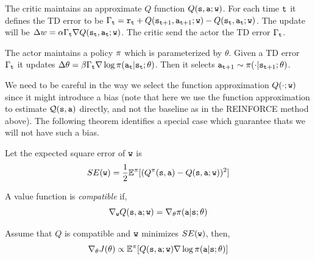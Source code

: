 The critic maintains an approximate $Q$ function $Q({\tt s},{\tt a};{\tt w})$. For each time ${\tt t}$ it defines the TD error to be $\Gamma_{\tt t} = {\tt r}_{\tt t} +Q({\tt s}_{{\tt t}+1},{\tt a}_{{\tt t}+1};{\tt w})-Q({\tt s}_{\tt t},{\tt a}_{\tt t};{\tt w})$. The update will be $\Delta w=\alpha\Gamma_{\tt t} \nabla Q({\tt s}_{\tt t},{\tt a}_{\tt t};{\tt w})$. The critic send the actor the TD error $\Gamma_{\tt t}$.

The actor maintains a policy $\pi$ which is parameterized by $\theta$. Given a TD error $\Gamma_{\tt t}$ it updates $\Delta \theta= \beta \Gamma_{\tt t} \nabla \log \pi({\tt a}_{\tt t}|{\tt s}_{\tt t};\theta)$. Then it selects ${\tt a}_{{\tt t}+1}\sim \pi(\cdot|{\tt s}_{{\tt t}+1};\theta)$.

We need to be careful in the way we select the function
approximation $Q(\cdot;{\tt w})$ since it might introduce a bias (note that here we use the function approximation to estimate $\mathcal{Q}({\tt s},{\tt a})$ directly, and not the baseline as in the REINFORCE method above).
The following theorem identifies a special case which guarantee
thats we will not have such a bias.

Let the expected square error of ${\tt w}$ is
\[
SE({\tt w})=\frac{1}{2}\mathbb{E}^\pi[(Q^\pi({\tt s},{\tt a})-Q({\tt s},{\tt a};{\tt w}))^2]
\]

A value function is {\em compatible} if,
\[
\nabla_{\tt w} Q({\tt s},{\tt a};{\tt w})= \nabla_\theta
\pi({\tt a}|{\tt s};\theta)
\]


\begin{theorem}
Assume that $Q$ is compatible and ${\tt w}$ minimizes $SE({\tt w})$,
then,
\[
\nabla_\theta J(\theta)\propto \mathbb{E}^\pi[Q({\tt s},{\tt a};{\tt w})
\nabla \log \pi({\tt a}|{\tt s};\theta)]
\]
\end{theorem}

